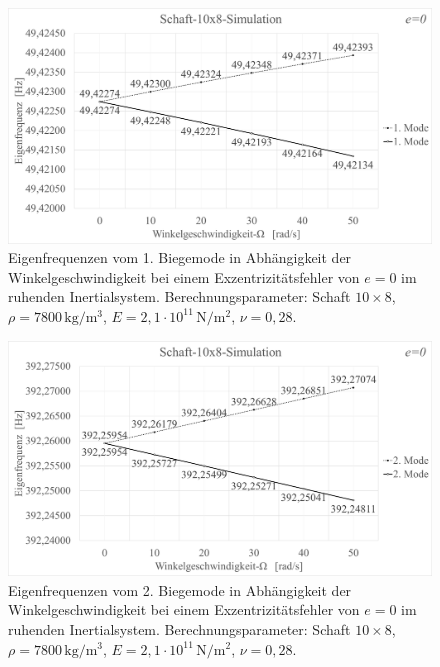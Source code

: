 	\begin{figure}[H]
		\centering
		\includegraphics[width=0.95\linewidth, height=0.36\textheight]{Ergebnisse/Schaft_10x8_1Mode_Simu_ruhend}
		\caption{Eigenfrequenzen vom 1. Biegemode in Abhängigkeit der Winkelgeschwindigkeit bei einem Exzentrizitätsfehler von $ e=0 $ im ruhenden Inertialsystem. Berechnungsparameter: Schaft $ 10\times8 $, $\rho = 7800 \,\text{kg}/\text{m}^{3} $, $ E=2,1\cdot 10^{11} \,\text{N}/\text{m}^{2} $, $ \nu=0,28 $.}
		\label{fig:Result-Schaft-10x8-Simulation-1-Mode-ruhend}
	\end{figure}

	\begin{figure}[H]
		\centering
		\includegraphics[width=0.95\linewidth, height=0.36\textheight]{Ergebnisse/Schaft_10x8_2Mode_Simu_ruhend}
		\caption{Eigenfrequenzen vom 2. Biegemode in Abhängigkeit der Winkelgeschwindigkeit bei einem Exzentrizitätsfehler von $ e=0 $ im ruhenden Inertialsystem. Berechnungsparameter: Schaft $ 10\times8 $, $\rho = 7800 \,\text{kg}/\text{m}^{3} $, $ E=2,1\cdot 10^{11} \,\text{N}/\text{m}^{2} $, $ \nu=0,28 $.}
		\label{fig:Result-Schaft-10x8-Simulation-2-Mode-ruhend}
	\end{figure}
	
